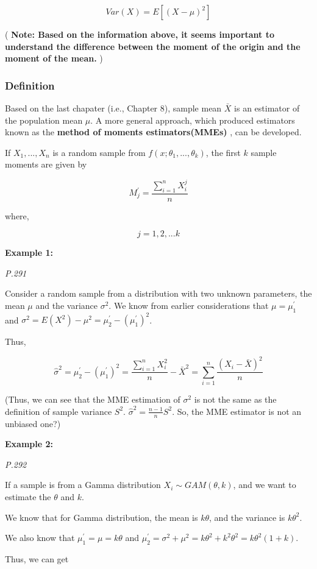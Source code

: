 \documentclass[]{book}
\begin{document}
\[Var(X)=E[(X-\mu)^2]\]

( \textbf{Note: Based on the information above, it seems important to understand the difference between the moment of the origin and the moment of the mean.} )

\hypertarget{definition}{%
\subsubsection{Definition}\label{definition}}

Based on the last chapater (i.e., Chapter 8), sample mean \(\bar{X}\) is an estimator of the population mean \(\mu\). A more general approach, which produced estimators known as the \textbf{method of moments estimators(MMEs)} , can be developed.

If \(X_1,...,X_n\) is a random sample from \(f(x; \theta_1,...,\theta_k)\), the first \(k\) sample moments are given by

\[M_j^{'}=\frac{\sum_{i=1}^n X_i^j}{n}\]

where,

\[j=1,2,...k\]

\textbf{Example 1:}

\emph{P.291}

Consider a random sample from a distribution with two unknown parameters, the mean \(\mu\) and the variance \(\sigma^2\). We know from earlier considerations that \(\mu=\mu^{'}_1\) and \(\sigma^2=E(X^2)-\mu^2=\mu_2^{'}-(\mu^{'}_1)^2\).

Thus,

\[\hat{\sigma}^2=\mu_2^{'}-(\mu^{'}_1)^2=\frac{\sum_{i=1}^n X_i^2}{n}-\bar{X}^2=\sum_{i=1}^n \frac{(X_i-\bar{X})^2}{n}\]

(Thus, we can see that the MME estimation of \(\sigma^2\) is not the same as the definition of sample variance \(S^2\). \(\hat{\sigma}^2=\frac{n-1}{n}S^2\). So, the MME estimator is not an unbiased one?)

\textbf{Example 2:}

\emph{P.292}

If a sample is from a Gamma distribution \(X_i \sim GAM(\theta,k)\), and we want to estimate the \(\theta\) and \(k\).

We know that for Gamma distribution, the mean is \(k\theta\), and the variance is \(k\theta^2\).

We also know that \(\mu_1^{'}=\mu=k\theta\) and \(\mu_2^{'}= \sigma^2+\mu^2= k\theta^2+k^2\theta^2=k\theta^2(1+k)\).

Thus, we can get
\end{document}
